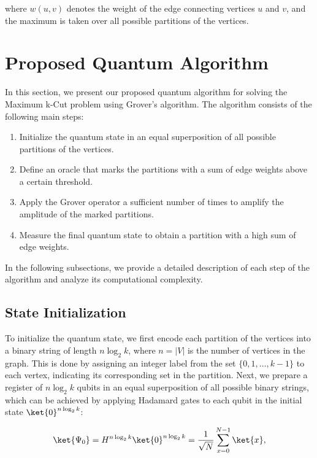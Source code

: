 where $w(u, v)$ denotes the weight of the edge connecting vertices $u$ and $v$, and the maximum is taken over all possible partitions of the vertices.

\section{Proposed Quantum Algorithm}
\label{sec:algorithm}

In this section, we present our proposed quantum algorithm for solving the Maximum k-Cut problem using Grover's algorithm. The algorithm consists of the following main steps:

\begin{enumerate}
    \item Initialize the quantum state in an equal superposition of all possible partitions of the vertices.
    \item Define an oracle that marks the partitions with a sum of edge weights above a certain threshold.
    \item Apply the Grover operator a sufficient number of times to amplify the amplitude of the marked partitions.
    \item Measure the final quantum state to obtain a partition with a high sum of edge weights.
\end{enumerate}

In the following subsections, we provide a detailed description of each step of the algorithm and analyze its computational complexity.

\subsection{State Initialization}

To initialize the quantum state, we first encode each partition of the vertices into a binary string of length $n \log_2 k$, where $n = |V|$ is the number of vertices in the graph. This is done by assigning an integer label from the set $\{0, 1, \dots, k-1\}$ to each vertex, indicating its corresponding set in the partition. Next, we prepare a register of $n \log_2 k$ qubits in an equal superposition of all possible binary strings, which can be achieved by applying Hadamard gates to each qubit in the initial state $\ket{0}^{n \log_2 k}$:

\begin{equation}
\ket{\Psi_0} = H^{n \log_2 k} \ket{0}^{n \log_2 k} = \frac{1}{\sqrt{N}} \sum_{x=0}^{N-1} \ket{x},
\label{eq:initial_state}
\end{equation}

